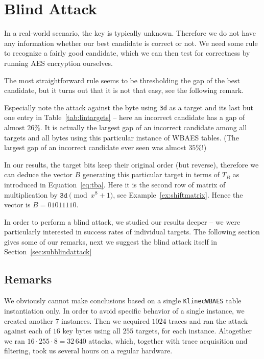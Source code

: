 \section{Blind Attack}
\label{sec:blindattack}

In a real-world scenario, the key is typically unknown. Therefore we do not have any information whether our best candidate is correct or not. We need some rule to recognize a fairly good candidate, which we can then test for correctness by running AES encryption ourselves.

The most straightforward rule seems to be thresholding the gap of the best candidate, but it turns out that it is not that easy, see the following remark.

\begin{remark}
\label{rem:false}
	Especially note the attack against the  byte using {\tt 3d} as a target and its last but one entry in Table~\ref{tab:lintargets} -- here an incorrect candidate has a gap of almost $26\%$. It is actually the largest gap of an incorrect candidate among all targets and all bytes using this particular instance of WBAES tables. (The largest gap of an incorrect candidate ever seen was almost $35\%$!)
	
	In our results, the target bits keep their original order (but reverse), therefore we can deduce the vector $B$ generating this particular target in terms of $T_B$ as introduced in Equation~\ref{eq:tba}. Here it is the second row of matrix of multiplication by $\texttt{3d}\pmod{x^8+1}$, see Example~\ref{ex:shiftmatrix}. Hence the vector is $B = 01011110$.
\end{remark}

In order to perform a blind attack, we studied our results deeper -- we were particularly interested in success rates of individual targets. The following section gives some of our remarks, next we suggest the blind attack itself in Section~\ref{sec:subblindattack}



\subsection{Remarks}
\label{sec:remarks}

We obviously cannot make conclusions based on a single {\tt KlinecWBAES} table instantiation only. In order to avoid specific behavior of a single instance, we created another $7$ instances. Then we acquired $1024$ traces and ran the attack against each of $16$ key bytes using all $255$ targets, for each instance. Altogether we ran $16\cdot255\cdot8=32\,640$ attacks, which, together with trace acquisition and filtering, took us several hours on a regular hardware.

